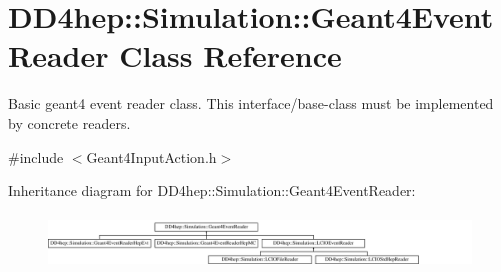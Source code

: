 \hypertarget{class_d_d4hep_1_1_simulation_1_1_geant4_event_reader}{}\section{D\+D4hep\+:\+:Simulation\+:\+:Geant4\+Event\+Reader Class Reference}
\label{class_d_d4hep_1_1_simulation_1_1_geant4_event_reader}


Basic geant4 event reader class. This interface/base-\/class must be implemented by concrete readers.  




{\ttfamily \#include $<$Geant4\+Input\+Action.\+h$>$}

Inheritance diagram for D\+D4hep\+:\+:Simulation\+:\+:Geant4\+Event\+Reader\+:\begin{figure}[H]
\begin{center}
\leavevmode
\includegraphics[height=1.443299cm]{class_d_d4hep_1_1_simulation_1_1_geant4_event_reader}
\end{center}
\end{figure}
